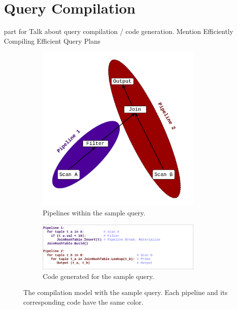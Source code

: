 \documentclass[12pt]{cmuthesis}
\begin{document}
\section{Query Compilation}
part for Talk about query compilation / code generation. Mention Efficiently Compiling Efficient Query Plans
\begin{figure}[H]
\centering
\begin{subfigure}{.5\textwidth}
 \centering
 \includegraphics[width=0.9\textwidth]{images/Pipeline.png}
 \caption{Pipelines within the sample query.}
  \label{fig:pipeline_graph}
\end{subfigure}%
\begin{subfigure}{.5\textwidth}
 \centering
 \includegraphics[width=0.9\textwidth]{images/PipelineCode.png}
 \caption{Code generated for the sample query.}
  \label{fig:pipeline_code}
\end{subfigure}
\caption{The compilation model with the sample query. Each pipeline and its corresponding code have the same color.}
\label{fig:update_map_intro}
\end{figure}
\end{document}
